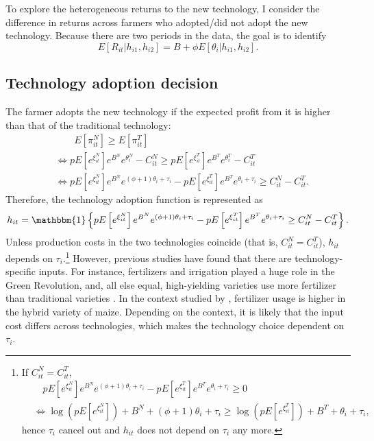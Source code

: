 \documentclass[11pt,letterpaper]{article}
\begin{document}
To explore the heterogeneous returns to the new technology, I consider the difference in returns across farmers who adopted/did not adopt the new technology.
Because there are two periods in the data, the goal is to identify
\begin{equation*}
  E[R_{it} | h_{i1}, h_{i2}] = B + \phi E[\theta_i | h_{i1}, h_{i2}].
\end{equation*}

\subsection{Technology adoption decision}

The farmer adopts the new technology if the expected profit from it is higher than that of the traditional technology:
\begin{align*}
  &\qquad E[\pi_{it}^N] \ge E[\pi_{it}^T] \\
  &\Leftrightarrow p E\left[e^{\xi_{it}^N} \right] e^{B^N} e^{\theta_i^N}  - C_{it}^N \ge p E\left[e^{\xi_{it}^T} \right] e^{B^T} e^{\theta_i^T} - C_{it}^T \\
  &\Leftrightarrow p E\left[e^{\xi_{it}^N} \right] e^{B^N} e^{(\phi + 1) \theta_i + \tau_i} - p E\left[e^{\xi_{it}^T} \right] e^{B^T} e^{\theta_i + \tau_i} \ge C_{it}^N - C_{it}^T.
\end{align*}
Therefore, the technology adoption function is represented as 
\begin{equation}\label{eq:adoption}
  h_{it} = \mathbbm{1}\left\{p E\left[e^{\xi_{it}^N} \right] e^{B^N} e^{(\phi + 1) \theta_i + \tau_i} - p E\left[e^{\xi_{it}^T} \right] e^{B^T} e^{\theta_i + \tau_i} \ge C_{it}^N - C_{it}^T\right\}.
\end{equation}
Unless production costs in the two technologies coincide (that is, $C_{it}^N = C_{it}^T$), $h_{it}$ depends on $\tau_i$.\footnote{
  If $C_{it}^N = C_{it}^T$,
  \begin{align*}
    &\quad p E\left[e^{\xi_{it}^N} \right] e^{B^N} e^{(\phi + 1) \theta_i + \tau_i} - p E\left[e^{\xi_{it}^T} \right] e^{B^T} e^{\theta_i + \tau_i} \ge 0 \\
    &\Leftrightarrow \log \left(p E\left[e^{\xi_{it}^N} \right] \right) + B^N + (\phi + 1) \theta_i + \tau_i \ge \log \left( p E\left[e^{\xi_{it}^T} \right] \right) + B^T + \theta_i + \tau_i,
  \end{align*}
  hence $\tau_i$ cancel out and $h_{it}$ does not depend on $\tau_i$ any more.
}
However, previous studies have found that there are technology-specific inputs.
For instance, fertilizers and irrigation played a huge role in the Green Revolution, and, all else equal, high-yielding varieties use more fertilizer than traditional varieties \citep{heisey2007fertilizers}.
In the context studied by \citet{Suri11}, fertilizer usage is higher in the hybrid variety of maize.
Depending on the context, it is likely that the input cost differs across technologies, which makes the technology choice dependent on $\tau_i$.
\end{document}
